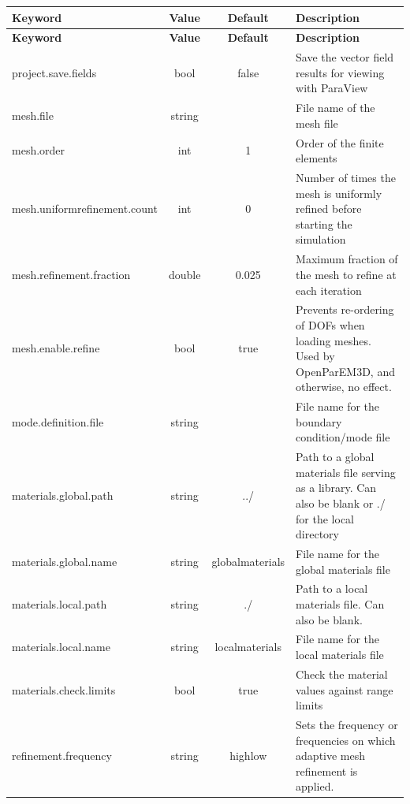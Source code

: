 \documentclass[titlepage]{article}
\renewcommand\_{\textunderscore\linebreak[1]}
\begin{document}
\tabcolsep=0.05cm
\small
\begin{longtable}[c]{|lccp{8cm}|}
    \hline
    \textbf{Keyword} & \textbf{Value} & \textbf{Default} & \textbf{Description} \\
    \hline
    \endfirsthead
    \hline
    \textbf{Keyword} & \textbf{Value} & \textbf{Default} & \textbf{Description} \\
    \hline
    \endhead
    project.save.fields          & bool   & false & Save the vector field results for viewing with ParaView \\
    mesh.file                    & string &       & File name of the mesh file \\
    mesh.order                   & int    & 1     & Order of the finite elements \\
    mesh.uniform\_refinement.count & int   & 0     & Number of times the mesh is uniformly refined before starting the simulation \\
    mesh.refinement.fraction     & double & 0.025 & Maximum fraction of the mesh to refine at each iteration \\
    mesh.enable.refine           & bool   & true  & Prevents re-ordering of DOFs when loading meshes.  Used by OpenParEM3D, and otherwise, no effect.  \\
    mode.definition.file         & string &       & File name for the boundary condition/mode file \\
    materials.global.path        & string & ../   & Path to a global materials file serving as a library.  Can also be blank or ./ for the local directory \\
    materials.global.name        & string & global\_materials & File name for the global materials file \\
    materials.local.path         & string & ./    & Path to a local materials file. Can also be blank. \\
    materials.local.name         & string & local\_materials & File name for the local materials file \\
    materials.check.limits       & bool   & true  & Check the material values against range limits \\
    refinement.frequency         & string & highlow & Sets the frequency or frequencies on which adaptive mesh refinement is applied.
                                                   

\end{longtable}
\end{document}
